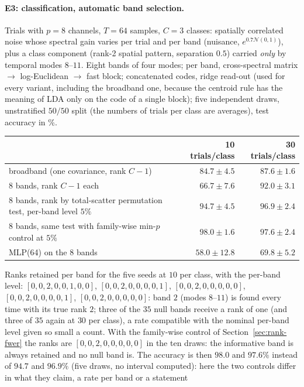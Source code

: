 \documentclass[11pt,a4paper]{article}
\theoremstyle{plain}
\theoremstyle{definition}
\theoremstyle{remark}
\begin{document}
\paragraph{E3: classification, automatic band selection.} Trials with $p=8$
channels, $T=64$ samples, $C=3$ classes: spatially correlated noise whose
spectral gain varies per trial and per band (nuisance, $e^{0.7\mathcal N(0,1)}$),
plus a class component (rank-2 spatial pattern, separation $0.5$) carried
\emph{only} by temporal modes $8$--$11$. Eight bands of four modes; per band,
cross-spectral matrix $\to$ log-Euclidean $\to$ fast block; concatenated
codes, ridge read-out (used for every variant, including the broadband one,
because the centroid rule has the meaning of LDA only on the code of a
single block); five independent draws, unstratified $50/50$ split
(the numbers of trials per class are averages), test accuracy in \%.
\begin{center}
\small
\begin{tabular}{lrr}
\toprule
& 10 trials/class & 30 trials/class \\
\midrule
broadband (one covariance, rank $C-1$) & $84.7\pm4.5$ & $87.6\pm1.6$ \\
8 bands, rank $C-1$ each & $66.7\pm7.6$ & $92.0\pm3.1$ \\
8 bands, rank by total-scatter permutation test, per-band level $5\%$ & $94.7\pm4.5$ & $96.9\pm2.4$ \\
8 bands, same test with family-wise min-$p$ control at $5\%$ & $\mathbf{98.0}\pm1.6$ & $\mathbf{97.6}\pm2.4$ \\
MLP(64) on the 8 bands & $58.0\pm12.8$ & $69.8\pm5.2$ \\
\bottomrule
\end{tabular}
\end{center}
Ranks retained per band for the five seeds at $10$ per class, with the
per-band level:
$[0,0,2,0,0,1,0,0]$, $[0,0,2,0,0,0,0,1]$, $[0,0,2,0,0,0,0,0]$,
$[0,0,2,0,0,0,0,1]$, $[0,0,2,0,0,0,0,0]$: band $2$ (modes $8$--$11$) is found
every time with its true rank $2$; three of the $35$ null bands receive a
rank of one (and three of $35$ again at $30$ per class), a rate compatible
with the nominal per-band level given so small a count. With the
family-wise control of Section~\ref{sec:rank-fwer} the ranks are
$[0,0,2,0,0,0,0,0]$ in the ten draws: the informative band is always
retained and no null band is. The accuracy is then $98.0$ and $97.6\%$
instead of $94.7$ and $96.9\%$ (five draws, no interval computed): here the
two controls differ in what they claim, a rate per band or a statement
\end{document}
